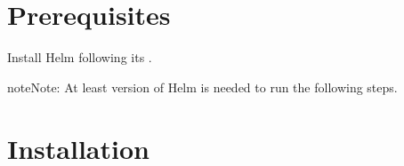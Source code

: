 \documentclass[letterpaper,10pt,english]{sphinxmanual}
\begin{document}
\section{Pre\sphinxhyphen{}requisites}
\label{\detokenize{helm:pre-requisites}}
Install Helm following its .

\begin{sphinxadmonition}{note}{Note:}
At least  version of Helm is needed to run the following steps.
\end{sphinxadmonition}


\section{Installation}
\end{document}
